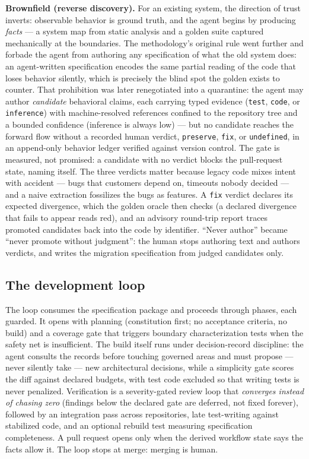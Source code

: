 \documentclass[11pt]{article}
\begin{document}
\textbf{Brownfield (reverse discovery).} For an existing system, the direction
of trust inverts: observable behavior is ground truth, and the agent begins by
producing \emph{facts} --- a system map from static analysis and a golden
suite captured mechanically at the boundaries. The methodology's original rule
went further and forbade the agent from authoring any specification of what
the old system does: an agent-written specification encodes the same partial
reading of the code that loses behavior silently, which is precisely the blind
spot the golden exists to counter. That prohibition was later renegotiated
into a quarantine: the agent may author \emph{candidate} behavioral claims,
each carrying typed evidence (\texttt{test}, \texttt{code}, or
\texttt{inference}) with machine-resolved references confined to the
repository tree and a bounded confidence (inference is always low) --- but no
candidate reaches the forward flow without a recorded human verdict,
\texttt{preserve}, \texttt{fix}, or \texttt{undefined}, in an append-only
behavior ledger verified against version control. The gate is measured, not
promised: a candidate with no verdict blocks the pull-request state, naming
itself. The three verdicts matter because legacy code mixes intent with
accident --- bugs that customers depend on, timeouts nobody decided --- and a
naive extraction fossilizes the bugs as features. A \texttt{fix} verdict
declares its expected divergence, which the golden oracle then checks (a
declared divergence that fails to appear reads red), and an advisory
round-trip report traces promoted candidates back into the code by
identifier. ``Never author'' became ``never promote without judgment'': the
human stops authoring text and authors verdicts, and writes the migration
specification from judged candidates only.

\subsection{The development loop}

The loop consumes the specification package and proceeds through phases, each
guarded. It opens with planning (constitution first; no acceptance criteria, no
build) and a coverage gate that triggers boundary characterization tests when the
safety net is insufficient. The build itself runs under decision-record
discipline: the agent consults the records before touching governed areas and
must propose --- never silently take --- new architectural decisions, while a
simplicity gate scores the diff against declared budgets, with test code excluded
so that writing tests is never penalized. Verification is a severity-gated review
loop that \emph{converges instead of chasing zero} (findings below the declared
gate are deferred, not fixed forever), followed by an integration pass across
repositories, late test-writing against stabilized code, and an optional rebuild
test measuring specification completeness. A pull request opens only when the
derived workflow state says the facts allow it. The loop stops at merge: merging
is human.
\end{document}
